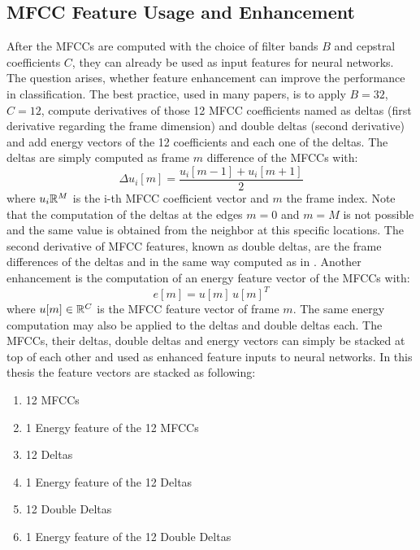 
\subsection{MFCC Feature Usage and Enhancement}\label{sec:signal_mfcc_enhancement}
After the MFCCs are computed with the choice of filter bands $B$ and cepstral coefficients $C$, they can already be used as input features for neural networks.
The question arises, whether feature enhancement can improve the performance in classification.
The best practice, used in many papers, is to apply $B=32$, $C=12$, compute derivatives of those 12 MFCC coefficients named as deltas (first derivative regarding the frame dimension) and double deltas (second derivative) and add energy vectors of the 12 coefficients and each one of the deltas.
The deltas are simply computed as frame $m$ difference of the MFCCs with:
\begin{equation}\label{eq:signal_mfcc_delta}
  \Delta u_i[m] = \frac{u_i[m - 1] + u_i[m + 1]}{2}
\end{equation}
where $u_i \mathbb{R}^M$ is the i-th MFCC coefficient vector and $m$ the frame index.
Note that the computation of the deltas at the edges $m=0$ and $m=M$ is not possible and the same value is obtained from the neighbor at this specific locations.
The second derivative of MFCC features, known as double deltas, are the frame differences of the deltas and in the same way computed as in .
Another enhancement is the computation of an energy feature vector of the MFCCs with:
\begin{equation}
  e[m] = u[m] \, u[m]^T 
\end{equation}
where $u[m] \in \mathbb{R}^C$ is the MFCC feature vector of frame $m$.
The same energy computation may also be applied to the deltas and double deltas each.
The MFCCs, their deltas, double deltas and energy vectors can simply be stacked at top of each other and used as enhanced feature inputs to neural networks.
In this thesis the feature vectors are stacked as following:
\begin{enumerate}
    \item 12 MFCCs
    \item 1 Energy feature of the 12 MFCCs
    \item 12 Deltas
    \item 1 Energy feature of the 12 Deltas
    \item 12 Double Deltas
    \item 1 Energy feature of the 12 Double Deltas
\end{enumerate}
